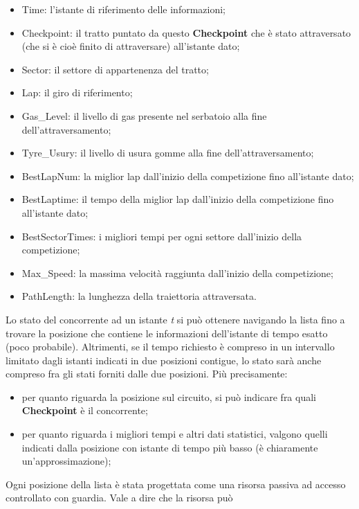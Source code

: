      \begin{itemize}
     \item Time: l'istante di riferimento delle informazioni;
     \item Checkpoint: il tratto puntato da questo \textbf{Checkpoint} che è stato attraversato (che si è cioè finito di attraversare) 
     all'istante dato;
     \item Sector: il settore di appartenenza del tratto;
     \item Lap: il giro di riferimento;
     \item Gas\_Level: il livello di gas presente nel serbatoio alla fine dell'attraversamento;
     \item Tyre\_Usury: il livello di usura gomme alla fine dell'attraversamento;
     \item BestLapNum: la miglior lap dall'inizio della competizione fino all'istante dato;
     \item BestLaptime: il tempo della miglior lap dall'inizio della competizione fino all'istante dato;
     \item BestSectorTimes: i migliori tempi per ogni settore dall'inizio della competizione;
     \item Max\_Speed: la massima velocità raggiunta dall'inizio della competizione;
     \item PathLength: la lunghezza della traiettoria attraversata.
     \end{itemize}
     Lo stato del concorrente ad un istante \emph{t} si può ottenere navigando la lista fino a trovare la posizione che contiene le informazioni
     dell'istante di tempo esatto (poco probabile). Altrimenti, se il tempo richiesto è compreso in un intervallo limitato dagli istanti
     indicati in due posizioni contigue, lo stato sarà anche compreso fra gli stati forniti dalle due posizioni. Più precisamente:\\
     \begin{itemize}
     \item per quanto riguarda la posizione sul circuito, si può indicare fra quali \textbf{Checkpoint} è il concorrente;
     \item per quanto riguarda i migliori tempi e altri dati statistici, valgono quelli indicati dalla posizione con istante di tempo più basso (è chiaramente
     un'approssimazione);
     \end{itemize}
     Ogni posizione della lista è stata progettata come una risorsa passiva ad accesso controllato con guardia. Vale a dire che la risorsa può
